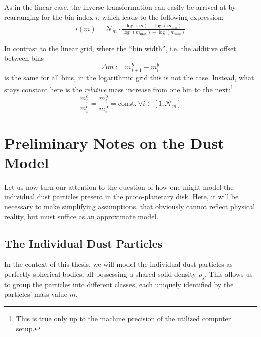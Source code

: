         As in the linear case, the inverse transformation can easily be arrived at by rearranging
        for the bin index $i$, which leads to the following expression:
        \begin{align}
            i(m) = \mathcal N_m\cdot \frac{
                \log(m)-\log(m_\text{min})
            }{
                \log(m_\text{max})-\log(m_\text{min})
            }
        \end{align}
        
        In contrast to the linear grid, where the ``bin width'', i.e. the additive offset between bins
        \begin{equation}
            \Delta m := m_{i+1}^b - m_i^b
        \end{equation}
        is the same for all bins, in the logarithmic grid this is not the case. Instead, what stays
        constant here is the \textit{relative} mass increase from one bin to the next:\footnote{This
        is true only up to the machine precision of the utilized computer setup.}
        \begin{equation}
            \frac{m_i^\text{c}}{m_i^\text{c}}
                =\frac{m_i^\text{b}}{m_i^\text{b}}
                =\text{const.}\ \forall i\in[1,\mathcal N_m]
        \end{equation}


\clearpage\section{Preliminary Notes on the Dust Model}
\label{sec:preliminary_notes_on_the_dust_model}

    Let us now turn our attention to the question of how one might model the individual 
    dust particles present in the proto-planetary disk.
    Here, it will be necessary to make simplifying assumptions, that obviously cannot 
    reflect physical reality, but must suffice as an approximate model. \\

    \subsection{The Individual Dust Particles}

        In the context of this thesis, we will model the individual dust particles as perfectly 
        spherical bodies, all possessing a shared solid density $\rho_s$. This allows us to 
        group the particles into different classes, each uniquely identified by the particles' 
        mass value $m$. \\

